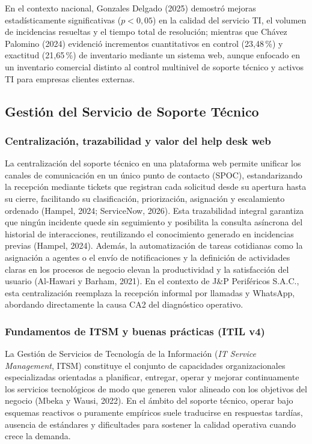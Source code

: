 En el contexto nacional, Gonzales Delgado (2025) demostró mejoras estadísticamente significativas ($p < 0,05$) en la calidad del servicio TI, el volumen de incidencias resueltas y el tiempo total de resolución; mientras que Chávez Palomino (2024) evidenció incrementos cuantitativos en control (23,48\,\%) y exactitud (21,65\,\%) de inventario mediante un sistema web, aunque enfocado en un inventario comercial distinto al control multinivel de soporte técnico y activos TI para empresas clientes externas.

\subsection{Gestión del Servicio de Soporte Técnico}

\vspace{0.6em}

\subsubsection{Centralización, trazabilidad y valor del help desk web}
La centralización del soporte técnico en una plataforma web permite unificar los canales de comunicación en un único punto de contacto (SPOC), estandarizando la recepción mediante tickets que registran cada solicitud desde su apertura hasta su cierre, facilitando su clasificación, priorización, asignación y escalamiento ordenado (Hampel, 2024; ServiceNow, 2026). Esta trazabilidad integral garantiza que ningún incidente quede sin seguimiento y posibilita la consulta asíncrona del historial de interacciones, reutilizando el conocimiento generado en incidencias previas (Hampel, 2024). Además, la automatización de tareas cotidianas como la asignación a agentes o el envío de notificaciones y la definición de actividades claras en los procesos de negocio elevan la productividad y la satisfacción del usuario (Al-Hawari y Barham, 2021). En el contexto de J\&P Periféricos S.A.C., esta centralización reemplaza la recepción informal por llamadas y WhatsApp, abordando directamente la causa CA2 del diagnóstico operativo.

\subsubsection{Fundamentos de ITSM y buenas prácticas (ITIL v4)}
La Gestión de Servicios de Tecnología de la Información (\textit{IT Service Management}, ITSM) constituye el conjunto de capacidades organizacionales especializadas orientadas a planificar, entregar, operar y mejorar continuamente los servicios tecnológicos de modo que generen valor alineado con los objetivos del negocio (Mbeka y Wausi, 2022). En el ámbito del soporte técnico, operar bajo esquemas reactivos o puramente empíricos suele traducirse en respuestas tardías, ausencia de estándares y dificultades para sostener la calidad operativa cuando crece la demanda.

